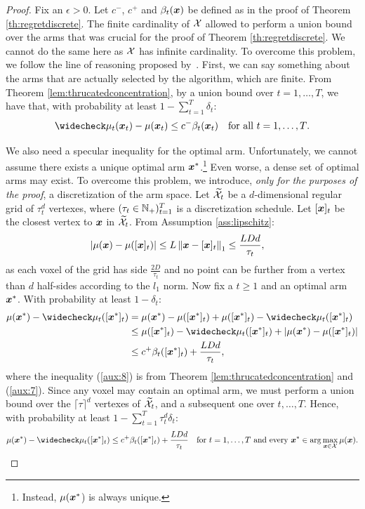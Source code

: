 \documentclass{article}
\begin{document}
\regretcompact*
\begin{proof}
	Fix an $\epsilon>0$. Let $c^{-}$, $c^{+}$ and $\beta_t(\vx)$ be defined as in the proof of Theorem \ref{th:regretdiscrete}.
	The finite cardinality of $\Xspace$ allowed to perform a union bound over the arms that was crucial for the proof of Theorem \ref{th:regretdiscrete}. We cannot do the same here as $\Xspace$ has infinite cardinality. To overcome this problem, we follow the line of reasoning proposed by~\citet{srinivas2010gaussian}. First, we can say something about the arms that are actually selected by the algorithm, which are finite. From Theorem \ref{lem:thrucatedconcentration}, by a union bound over $t=1,\dots,T$, we have that, with probability at least $1-\sum_{t=1}^T\delta_t$:
	\begin{align}\label{aux:6}
		&\wc{\mu_t}(\vx_t) - \mu(\vx_t) \leq c^{-}\beta_t(\vx_t) &\text{for all $t=1,\dots,T$}.
	\end{align}
	
	We also need a specular inequality for the optimal arm. Unfortunately, we cannot assume there exists a unique optimal arm $\vx^*$.\footnote{Instead, $\mu(\vx^*$) is always unique.} Even worse, a dense set of optimal arms may exist. To overcome this problem, we introduce, \textit{only for the purposes of the proof}, a discretization of the arm space. Let $\wt{\Xspace}_t$ be a $d$-dimensional regular grid of $\tau_t^d$ vertexes, where $(\tau_t\in\Naturals_{+})_{t=1}^T$ is a discretization schedule. Let $[\vx]_t$ be the closest vertex to $\vx$ in $\wt{\Xspace}_t$. From Assumption \ref{ass:lipschitz}:
	\begin{align}\label{aux:7}
		&|\mu(\vx) - \mu([\vx]_t)| \leq L\norm[1]{\vx - [\vx]_t} \leq \frac{LDd}{\tau_t},
	\end{align}
	as each voxel of the grid has side $\frac{2D}{\tau_t}$ and no point can be further from a vertex than $d$ half-sides according to the $l_1$ norm. Now fix a $t\geq1$ and an optimal arm $\vx^*$. With probability at least $1-\delta_t$:
	\begin{align}
		\mu(\vx^*) - \wc{\mu}_t([\vx^*]_t) 
		&= \mu(\vx^*) - \mu([\vx^*]_t) + \mu([\vx^*]_t) - \wc{\mu}_t([\vx^*]_t)  \nonumber\\
		&\leq \mu([\vx^*]_t) - \wc{\mu}_t([\vx^*]_t) + |\mu(\vx^*) - \mu([\vx^*]_t)| \nonumber\\
		&\leq c^{+}\beta_t([\vx^*]_t) + \frac{LDd}{\tau_t}, \label{aux:8}
	\end{align}
	where the inequality (\ref{aux:8}) is from Theorem \ref{lem:thrucatedconcentration} and (\ref{aux:7}). Since any voxel may contain an optimal arm, we must perform a union bound over the $\lceil\tau\rceil^d$ vertexes of $\wt{\Xspace}_t$, and a subsequent one over $t,\dots,T$. Hence, with probability at least $1-\sum_{t=1}^{T}\tau_t^d\delta_t$:
	\begin{align}\label{aux:9}
		&\mu(\vx^*) - \wc{\mu}_t([\vx^*]_t) \leq c^{+}\beta_t([\vx^*]_t) + \frac{LDd}{\tau_t} &\text{for $t=1,\dots,T$ and every $\vx^*\in\arg\max_{\vx\in\Xspace}\mu(\vx)$}.
	\end{align}
	

\end{proof}
\end{document}
